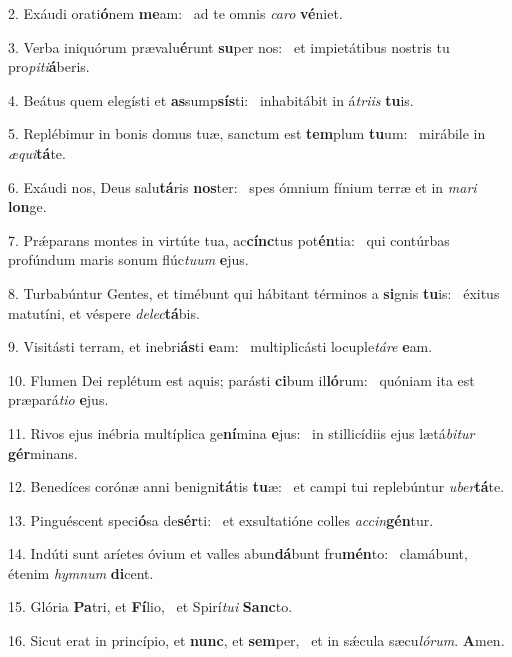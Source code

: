 2. Exáudi orati\textbf{ó}nem \textbf{me}am: \ast\  ad te omnis \textit{ca}\textit{ro} \textbf{vé}niet.\

3. Verba iniquórum prævalu\textbf{é}runt \textbf{su}per nos: \ast\  et impietátibus nostris tu pro\textit{pi}\textit{ti}\textbf{á}beris.\

4. Beátus quem elegísti et \textbf{as}sump\textbf{sís}ti: \ast\  inhabitábit in á\textit{tri}\textit{is} \textbf{tu}is.\

5. Replébimur in bonis domus tuæ, sanctum est \textbf{tem}plum \textbf{tu}um: \ast\  mirábile in \textit{æ}\textit{qui}\textbf{tá}te.\

6. Exáudi nos, Deus salu\textbf{tá}ris \textbf{nos}ter: \ast\  spes ómnium fínium terræ et in \textit{ma}\textit{ri} \textbf{lon}ge.\

7. Prǽparans montes in virtúte tua, ac\textbf{cínc}tus pot\textbf{én}tia: \ast\  qui contúrbas profúndum maris sonum flúc\textit{tu}\textit{um} \textbf{e}jus.\

8. Turbabúntur Gentes, et timébunt qui hábitant términos a \textbf{si}gnis \textbf{tu}is: \ast\  éxitus matutíni, et véspere \textit{de}\textit{lec}\textbf{tá}bis.\

9. Visitásti terram, et inebri\textbf{ás}ti \textbf{e}am: \ast\  multiplicásti locuple\textit{tá}\textit{re} \textbf{e}am.\

10. Flumen Dei replétum est aquis; parásti \textbf{ci}bum il\textbf{ló}rum: \ast\  quóniam ita est præpará\textit{ti}\textit{o} \textbf{e}jus.\

11. Rivos ejus inébria multíplica ge\textbf{ní}mina \textbf{e}jus: \ast\  in stillicídiis ejus lætá\textit{bi}\textit{tur} \textbf{gér}minans.\

12. Benedíces corónæ anni benigni\textbf{tá}tis \textbf{tu}æ: \ast\  et campi tui replebúntur \textit{u}\textit{ber}\textbf{tá}te.\

13. Pinguéscent speci\textbf{ó}sa de\textbf{sér}ti: \ast\  et exsultatióne colles \textit{ac}\textit{cin}\textbf{gén}tur.\

14. Indúti sunt aríetes óvium et valles abun\textbf{dá}bunt fru\textbf{mén}to: \ast\  clamábunt, étenim \textit{hym}\textit{num} \textbf{di}cent.\

15. Glória \textbf{Pa}tri, et \textbf{Fí}lio, \ast\  et Spirí\textit{tu}\textit{i} \textbf{Sanc}to.\

16. Sicut erat in princípio, et \textbf{nunc}, et \textbf{sem}per, \ast\  et in sǽcula sæcu\textit{ló}\textit{rum}. \textbf{A}men.\


